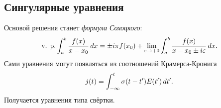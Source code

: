 

\subsection*{Сингулярные уравнения}


Основой решения станет \textit{формула Сохоцкого}:
\begin{equation*}
		\text{v. p.} \int_{a}^{b} \frac{f(x)}{x-x_0} \, d x = 
		\pm i \pi f(x_0) + \lim_{\varepsilon \to + 0} \int_{a}^{b} \frac{f(x)}{x-x_0 \pm i \varepsilon} \, d x.
\end{equation*}
Сами уравнения могут появляться из соотношений Крамерса-Кронига
\begin{equation*}
	j(t) = \int_{-\infty}^{t} \sigma(t-t') E(t') \, d t'.
\end{equation*}
Получается уравнения типа свёртки. 